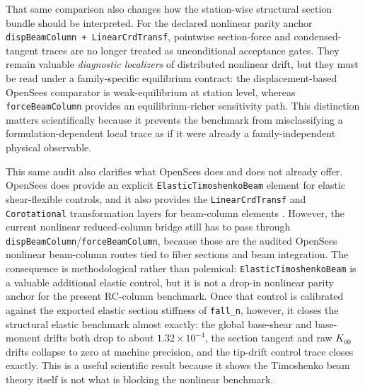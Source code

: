 That same comparison also changes how the station-wise structural section
bundle should be interpreted. For the declared nonlinear parity anchor
\texttt{dispBeamColumn + LinearCrdTransf}, pointwise section-force and
condensed-tangent traces are no longer treated as unconditional acceptance
gates. They remain valuable \emph{diagnostic localizers} of distributed
nonlinear drift, but they must be read under a family-specific equilibrium
contract: the displacement-based OpenSees comparator is weak-equilibrium at
station level, whereas \texttt{forceBeamColumn} provides an equilibrium-richer
sensitivity path. This distinction matters scientifically because it prevents
the benchmark from misclassifying a formulation-dependent local trace as if it
were already a family-independent physical observable.

This same audit also clarifies what OpenSees does and does not already offer.
OpenSees does provide an explicit \texttt{ElasticTimoshenkoBeam} element for
elastic shear-flexible controls, and it also provides the
\texttt{LinearCrdTransf} and \texttt{Corotational} transformation layers for
beam-column elements \cite{OpenSeesElasticTimoshenkoBeamWiki,OpenSeesDispBeamColumnDocs,OpenSeesForceBeamColumnDocs,OpenSeesCorotationalCrdTransfDocs}.
However, the current nonlinear reduced-column bridge still has to pass through
\texttt{dispBeamColumn}/\texttt{forceBeamColumn}, because those are the audited
OpenSees nonlinear beam-column routes tied to fiber sections and beam
integration. The consequence is methodological rather than polemical:
\texttt{ElasticTimoshenkoBeam} is a valuable additional elastic control, but it
is not a drop-in nonlinear parity anchor for the present RC-column benchmark.
Once that control is calibrated against the exported elastic section stiffness
of \texttt{fall\_n}, however, it closes the structural elastic benchmark almost
exactly: the global base-shear and base-moment drifts both drop to about
\(1.32\times10^{-4}\), the section tangent and raw \(K_{00}\) drifts collapse
to zero at machine precision, and the tip-drift control trace closes exactly.
This is a useful scientific result because it shows the Timoshenko beam theory
itself is not what is blocking the nonlinear benchmark.

